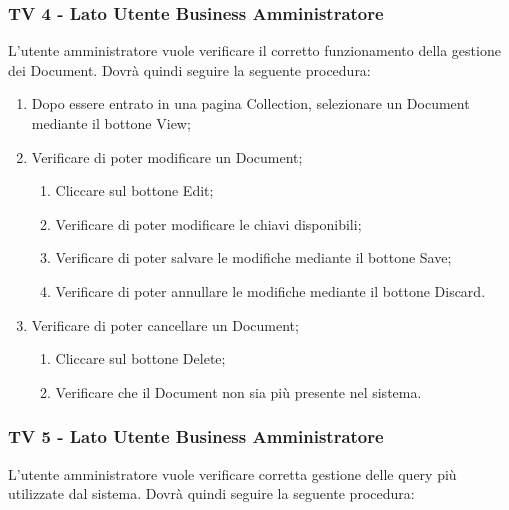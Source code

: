 \subsubsection{TV 4 - Lato Utente Business Amministratore}

L’utente amministratore vuole verificare il corretto funzionamento della gestione dei Document.
Dovrà quindi seguire la seguente procedura:


\begin{enumerate}
\item Dopo essere entrato in una pagina Collection, selezionare un Document mediante il bottone View;
\item Verificare di poter modificare un Document;
\begin{enumerate}
\item Cliccare sul bottone Edit;
\item Verificare di poter modificare le chiavi disponibili;
\item Verificare di poter salvare le modifiche mediante il bottone Save;
\item Verificare di poter annullare le modifiche mediante il bottone Discard.
\end{enumerate}
\item Verificare di poter cancellare un Document;
\begin{enumerate}
\item Cliccare sul bottone Delete;
\item Verificare che il Document non sia più presente nel sistema.
\end{enumerate}
\end{enumerate}


\subsubsection{TV 5 - Lato Utente Business Amministratore}
L’utente amministratore vuole verificare corretta gestione delle query più utilizzate dal sistema.
Dovrà quindi seguire la seguente procedura:


